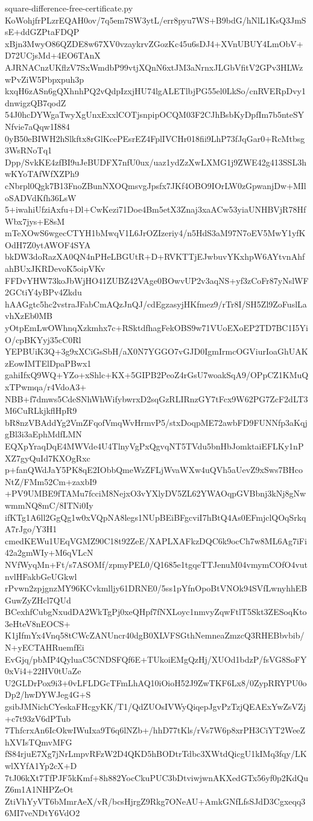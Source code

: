\documentclass[11pt]{article}
\theoremstyle{definition}
\theoremstyle{remark}
\begin{document}
\begin{filecontents*}[overwrite]{square-difference-free-certificate.py}
KoWohjfrPLzrEQAH0ov/7q5em7SW3ytL/err8pyu7WS+B9bdG/hNlL1KsQ3JmSsE+ddGZPtaFDQP
xBjn3MwyO86QZDE8w67XV0vzaykrvZGozKc45u6sDJ4+XVnUBUY4LmObV+D72UCjsMd+4EO6TAnX
AJRNACnzUKflzV7SxWmdbP99vtjXQnN6xtJM3aNrnxJLGbVfitV2GPv3HLWzwPvZiW5Pbpxpuh3p
kxqH6zASn6gQXhnhPQ2vQdpIzxjHU74lgALETlbjPG55el0LkSo/cnRVERpDvy1dnwigzQB7qodZ
54J0hcDYWgaTwyXgUnxExxlCOTjsnpipOCQM03F2CJhBsbKyDpfIm7b5nteSYNfvie7aQqw1I884
0yB50eBIWH2hSlkftx8rGlKcePEsrEZ4FplIVCHr018fii9LhP73fJqGar0+RcMtbsg3WsRNoTq1
Dpp/SvkKE4zfBI9uJeBUDFX7nfU0ux/uaz1ydZzXwLXMG1j9ZWE42g413SSL3hwKYoTAfWfXZPh9
cNbrpl0Qgk7B13FnoZBunNXOQmsvgJpsfx7JKf4OBO9IOrLW0zGpwanjDw+MIloSADVdKfh36LsW
5+iwahiUfziAxfu+Dl+CwKezi71Doe4Bm5etX3Znaj3xaACw53yiaUNHBVjR78HfWbx7jys+E8sM
mTeXOwS6wgecCTYH1bMwqV1L6JrOZIzeriy4/n5HdS3aM97N7oEV5MwY1yfKOdH7Z0ytAWOF4SYA
bkDW3doRazXA0QN4nPHeLBGUtR+D+RVKTTjEJwbuvYKxhpW6AYtvnAhfahBUxJKRDevoK5oipVKv
FFDvYHW73koJbWjHO41ZUBZ42VAge0BOwvUP2v3aqNS+yf3zCoFr87yNslWF2GCtiY4yBPv4Zkdu
hAAGgtc5hc2vstraJFabCmAQzJnQJ/cdEgzasyjHKfmez9/rTr8I/SH5Zl9ZoFuslLavhXzEb0MB
yOtpEmLwOWhnqXzkmhx7c+RSktdfhagFekOBS9w71VUoEXoEP2TD7BC1I5YiO/cpBKYyj35cC0Rl
YEPBUiK3Q+3g9xXCiGsSbH/aX0N7YGGO7vGJD0IgmIrmcOGViurIoaGhUAKzEowIMTElDpaPBwx1
gahiIfxQ9WQ+YZo+xShlc+KX+5GIPB2PeoZ4rGsU7woakSqA9/OPpCZ1KMuQxTPwmqa/r4VdoA3+
NBB+f7dmws5CdeSNhWhWifybwrxD2sqGzRLIRnzGY7tFcx9W62PG7ZcF2dLT3M6CuRLkjkflHpR9
bR8nzVBAddYg2VmZFqofVmqWvHrmvP5/stxDoqpME72awbFD9FUNNfp3aKqjgBl3i3aEphMdfLMN
EQXpYraqDqE4MWVde4U4TlnyVgPxQgvqNT5TVdu5bnHbJomktaiEFLKy1nPXZ7gyQuId7KXOgRxc
p+fanQWdJaY5PK8qE2IObbQmeWzZFLjWvaWXw4uQVh5aUevZ9xSws7BHcoNtZ/FMm52Cm+zaxbI9
+PV9UMBE9fTAMu7fcciM8NejxO3vYXlyDV5ZL62YWAOqpGVBbnj3kNj8gNwwmmNQ8mC/8ITNi0Iy
ifKTg1A6ll2GgQg1w0xVQpNA8legs1NUpBEiBFgcviI7hBtQ4As0EFmjclQOqSrkqA7rJgo/Y3H1
cmedKEWu1UEqVGMZ90C18t92ZeE/XAPLXAFkzDQC6k9ocCh7w8ML6Ag7iFi42a2gmWIy+M6qVLcN
NVfWyqMn+Ft/s7ASOMf/zpmyPEL0/Q1685e1tgqeTTJenuM04vmymCOfO4vutnvlHFakbGeUGkwl
rPvwn2zpjgnzMY96KCvkmlljy61DRNE0/5ss1pYfnOpoBtVNOk94SVfLwnyhhEBGuwZyZHcl7QUd
BCexhfCubgNxudDA2WkTgPj0xeQHpf7fNXLoyc1nmvyZqwFtlT5Skt3ZESoqKto3eHteV8nEOCS+
K1jIfmYx4Vnq58tCWcZANUncr40dgB0XLVFSGthNemneaZmzcQ3RHEBbvbib/N+yECTAHRuemfEi
EvGjq/pbMP4QyluaC5CNDSFQf6E+TUkoiEMgQzHj/XUOd1bdzP/fsVG8SoFY0xVi4+22HV0tUaZe
U2GLDrPox9i3+0vLFLDGcTFmLhAQ10iOioH52J9ZwTKF6Lx8/0ZypRRYPU0oDp2/hwDYWJeg4G+S
gsibJMNichCYeskaFHcgyKK/T1/QdZUOsIVWyQiqepJgvPzTzjQEAExYwZsVZj+c7t93zV6dPTub
7ThfcrxAn6IcOkwIWuIxa9T6q6lNZb+/hhD77tKls/rVs7W6p8xrPH3CiYT2WeeZhXVIsTQmvMFG
fS84rjuE7Xg7jNrLmpvRFzW2D4QKD5hBODtrTdbc3XWtdQicgU1kIMq3fqy/LKwlXYfA1Yp2cX+D
7tJ06kXt7TfPJF5kKmf+8h882YocCkuPUC3bDtviwjwnAKXedGTx56yf0p2KdQuZ6m1A1NHPZeOt
ZtiVhYyVT6bMmrAeX/vR/bcsHjrgZ9Rkg7ONeAU+AmkGNfLfsSJdD3Cgxeqq36MI7veNDtY6VdO2

\end{filecontents*}
\end{document}
